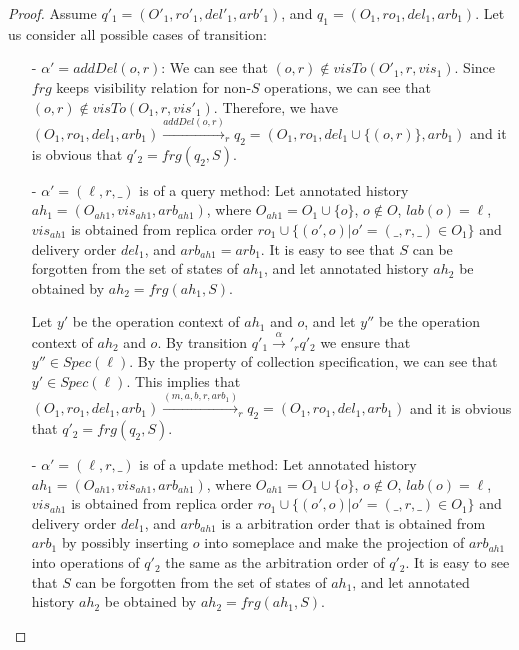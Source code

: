\begin {proof}

Assume $q'_1 = (O'_1,\mathit{ro}'_1,\mathit{del}'_1,\mathit{arb}'_1)$, and $q_1 = (O_1,\mathit{ro}_1,\mathit{del}_1,\mathit{arb}_1)$. Let us consider all possible cases of transition:

\begin{itemize}
\setlength{\itemsep}{0.5pt}
\item[-] $\alpha' = \mathit{addDel}(o,r)$: We can see that $(o,r)\notin visTo(O'_1,r,\mathit{vis}_1)$. Since $\mathit{frg}$ keeps visibility relation for non-$S$ operations, we can see that $(o,r)\notin visTo(O_1,r,\mathit{vis}'_1)$. Therefore, we have $ (O_1,\mathit{ro}_1,\mathit{del}_1,\mathit{arb}_1) {\xrightarrow{addDel(o,r)}}_r q_2 = (O_1,\mathit{ro}_1,\mathit{del}_1 \cup \{ (o,r) \},\mathit{arb}_1)$ and it is obvious that $q'_2 = \mathit{frg}(q_2,S)$. 

\item[-] $\alpha' = (\ell,r,\_)$ is of a query method: Let annotated history $\mathit{ah}_1 = (O_{\mathit{ah1}},\mathit{vis}_{\mathit{ah1}},\mathit{arb}_{\mathit{ah1}})$, where $O_{\mathit{ah1}} = O_1 \cup \{ o \}$, $o \notin O$, $\mathit{lab}(o)=\ell$, $\mathit{vis}_{\mathit{ah1}}$ is obtained from replica order $\mathit{ro}_1 \cup \{ (o',o) \vert o' = (\_,r,\_) \in O_1\}$ and delivery order $\mathit{del}_1$, and $\mathit{arb}_{\mathit{ah1}} = \mathit{arb}_1$. It is easy to see that $S$ can be forgotten from the set of states of $\mathit{ah}_1$, and let annotated history $\mathit{ah}_2$ be obtained by $\mathit{ah}_2 = \mathit{frg}(\mathit{ah}_1,S)$.

    Let $y'$ be the operation context of $\mathit{ah}_1$ and $o$, and let $y''$ be the operation context of $\mathit{ah}_2$ and $o$. By transition $q'_1 {\xrightarrow{\alpha}'}_r q'_2$ we ensure that $y'' \in \mathit{Spec}(\ell)$. By the property of collection specification, we can see that $y' \in \mathit{Spec}(\ell)$. This implies that $(O_1,\mathit{ro}_1,\mathit{del}_1,\mathit{arb}_1) {\xrightarrow{(m,a,b,r,\mathit{arb}_1)}}_r q_2 = (O_1,\mathit{ro}_1,\mathit{del}_1,\mathit{arb}_1)$ and it is obvious that $q'_2 = \mathit{frg}(q_2,S)$.

\item[-] $\alpha' = (\ell,r,\_)$ is of a update method: Let annotated history $\mathit{ah}_1 = (O_{\mathit{ah1}},\mathit{vis}_{\mathit{ah1}},\mathit{arb}_{\mathit{ah1}})$, where $O_{\mathit{ah1}} = O_1 \cup \{ o \}$, $o \notin O$, $\mathit{lab}(o)=\ell$, $\mathit{vis}_{\mathit{ah1}}$ is obtained from replica order $\mathit{ro}_1 \cup \{ (o',o) \vert o' = (\_,r,\_) \in O_1\}$ and delivery order $\mathit{del}_1$, and $\mathit{arb}_{\mathit{ah1}}$ is a arbitration order that is obtained from $\mathit{arb}_1$ by possibly inserting $o$ into someplace and make the projection of $\mathit{arb}_{\mathit{ah1}}$ into operations of $q'_2$ the same as the arbitration order of $q'_2$. It is easy to see that $S$ can be forgotten from the set of states of $\mathit{ah}_1$, and let annotated history $\mathit{ah}_2$ be obtained by $\mathit{ah}_2 = \mathit{frg}(\mathit{ah}_1,S)$.


\end{itemize}
\end{proof}
